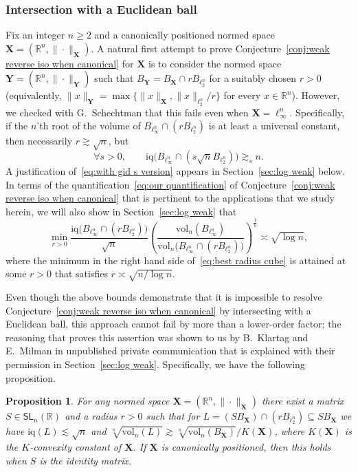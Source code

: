 \documentclass[11pt,reqno]{amsart}
\renewcommand{\ge}{\geqslant}
\newcommand{\X}{\mathbf X}
\newcommand{\Y}{\mathbf Y}
\newcommand{\R}{\mathbb R}
\newtheorem{proposition}[theorem]{Proposition}
\theoremstyle{remark}
\newcommand{\iq}{\mathrm{iq}}
\newcommand{\SL}{\mathsf{SL}}
\renewcommand{\subset}{\subseteq}
\newcommand{\vol}{\mathrm{vol}}
\renewcommand{\1}{\mathbf 1}
\begin{document}
\subsubsection{Intersection with a Euclidean ball}\label{sec:intersection} Fix an integer $n\ge 2$ and a canonically positioned normed space $\X=(\R^n,\|\cdot\|_\X)$.  A natural first attempt to prove Conjecture~\ref{conj:weak reverse iso when canonical}  for $\X$ is to consider the normed space $\Y=(\R^n,\|\cdot\|_\Y)$ such that  $B_\Y=B_\X\cap rB_{\ell_2^n}$ for a suitably chosen $r>0$ (equivalently, $\|x\|_\Y=\max\{\|x\|_\X,\|x\|_{\ell_2^n}/r\}$ for every $x\in \R^n$). However, we checked with G.~Schechtman that this fails even when $\X=\ell_\infty^n$. Specifically, if the $n$'th root of the volume of $B_{\ell_\infty^n}\cap (rB_{\ell_2^n})$ is at least a universal constant, then necessarily $r\gtrsim \sqrt{n}$, but
\begin{equation}\label{eq:with gid s version}
\forall s>0,\qquad \iq\big(B_{\ell_\infty^n}\cap (s\sqrt{n}B_{\ell_2^n})\big)\gtrsim_s n.
\end{equation}
A justification of~\eqref{eq:with gid s version} appears in Section~\ref{sec:log weak} below. In terms of the quantification~\eqref{eq:our quantification} of Conjecture~\ref{conj:weak reverse iso when canonical} that is pertinent to the applications that we study herein, we will also show in Section~\ref{sec:log weak} that
\begin{equation}\label{eq:best radius cube}
\min_{r>0}\frac{\iq\big(B_{\ell_\infty^n}\cap (rB_{\ell_2^n})\big)}{\sqrt{n}}\left(\frac{\vol_n(B_{\ell_\infty^n})}{\vol_n\big(B_{\ell_\infty^n}\cap (rB_{\ell_2^n})\big)}\right)^{\frac{1}{n}}\asymp \sqrt{\log n},
\end{equation}
where the minimum in the right hand side of~\eqref{eq:best radius cube} is attained at some $r>0$ that satisfies $r\asymp \sqrt{n/\log n}$.

Even though the above bounds demonstrate that it is impossible to  resolve  Conjecture~\ref{conj:weak reverse iso when canonical}  by intersecting with a Euclidean ball,  this approach cannot fail by more than a lower-order factor; the reasoning that proves this assertion was shown to us by B.~Klartag and E.~Milman in unpublished private communication that is explained with their permission in Section~\ref{sec:log weak}. Specifically, we have the following proposition.




\begin{proposition}\label{prop:K convexity}For any normed space $\X=(\R^n,\|\cdot\|_\X)$ there exist a matrix  $S\in \SL_n(\R)$ and a radius $r>0$ such that for $L=(SB_\X)\cap (r B_{\ell_2^n})\subset SB_\X$ we have $\iq(L)\lesssim \sqrt{n}$ and $\sqrt[n]{\vol_n(L)}\gtrsim \sqrt[n]{\vol_n(B_\X)}/K(\X)$, where $K(\X)$ is the $K$-convexity constant of $\X$. If $\X$ is canonically positioned, then this holds when  $S$ is the identity matrix.
\end{proposition}
\end{document}
